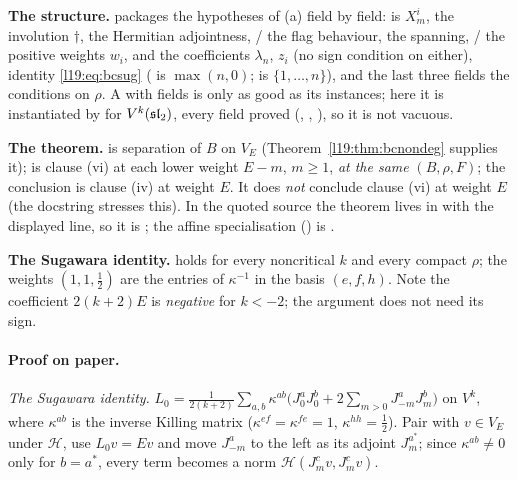 \begin{dictionary}
\textbf{The structure.}  packages the hypotheses of (a) field by field:  is
$X^i_m$,  the involution $\dagger$,  the Hermitian adjointness, /
the flag behaviour,  the spanning, / the positive weights $w_i$,  and
 the coefficients $\lambda_n$, $z_i$ (no sign condition on either),  identity
\eqref{l19:eq:bcsug} ( is $\max(n,0)$;  is $\{1,\dots,n\}$), and the last three
fields the conditions on $\rho$. A  with  fields is only as good as its instances; here it is
instantiated by  for $V^k(\mathfrak{sl}_2)$, every field proved (,
, ), so it is not vacuous.

\textbf{The theorem.}  is separation of $B$ on $V_E$ (Theorem~\ref{l19:thm:bcnondeg} supplies it);
 is clause (vi) at each lower weight $E-m$, $m\ge1$, \emph{at the same} $(B,\rho,F)$; the conclusion is
clause (iv) at weight $E$. It does \emph{not} conclude clause (vi) at weight $E$ (the docstring stresses this). In the
quoted source the theorem lives in  with the displayed  line, so it is
; the affine specialisation 
() is
\allowbreak{}.

\textbf{The Sugawara identity.}  holds for every noncritical $k$ and every compact $\rho$; the
weights $(1,1,\tfrac12)$ are the entries of $\kappa^{-1}$ in the basis $(e,f,h)$. Note the coefficient $2(k+2)E$ is
\emph{negative} for $k<-2$; the argument does not need its sign.
\end{dictionary}

\paragraph{Proof on paper.} \emph{The Sugawara identity.} $L_0 = \frac{1}{2(k+2)}\sum_{a,b}\kappa^{ab}
\bigl(J^a_0J^b_0 + 2\sum_{m>0}J^a_{-m}J^b_m\bigr)$ on $V^k$, where $\kappa^{ab}$ is the inverse Killing matrix
($\kappa^{ef} = \kappa^{fe} = 1$, $\kappa^{hh} = \tfrac12$). Pair with $v\in V_E$ under $\mathcal H$, use $L_0v = Ev$ and move
$J^a_{-m}$ to the left as its adjoint $J^{a^*}_m$; since $\kappa^{ab}\ne0$ only for $b = a^*$, every term becomes a
norm $\mathcal H(J^c_mv,J^c_mv)$.

